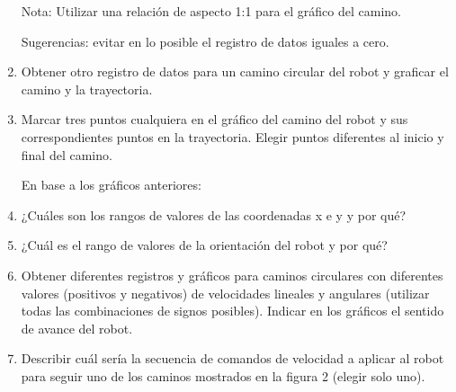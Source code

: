 \documentclass[tp]{lcc}
\begin{document}
\begin{enumerate}
Nota: Utilizar una relación de aspecto 1:1 para el gráfico del camino.

Sugerencias: evitar en lo posible el registro de datos iguales a cero.

\item Obtener otro registro de datos para un camino circular del robot y graficar el camino y la trayectoria.
\item Marcar tres puntos cualquiera en el gráfico del camino del robot y sus correspondientes puntos en la trayectoria. Elegir puntos diferentes al inicio y final del camino.


En base a los gráficos anteriores:


\item ¿Cuáles son los rangos de valores de las coordenadas x e y y por qué?

\item  ¿Cuál es el rango de valores de la orientación del robot y por qué?


\item Obtener diferentes registros y gráficos para caminos circulares con diferentes valores (positivos y negativos) de velocidades lineales y angulares (utilizar todas las combinaciones de signos posibles). Indicar en los gráficos el sentido de avance del robot.

\item Describir cuál sería la secuencia de comandos de velocidad a aplicar al robot para seguir uno de
los caminos mostrados en la figura 2 (elegir solo uno).

\end{enumerate}

\printbibliography
\end{document}
